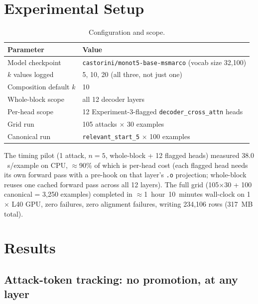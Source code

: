 \documentclass[11pt]{article}
\begin{document}
\section{Experimental Setup}

\begin{table}[H]
\centering
\caption{Configuration and scope.}
\begin{tabular}{ll}
\toprule
Parameter & Value \\
\midrule
Model checkpoint & \texttt{castorini/monot5-base-msmarco} (vocab size 32{,}100) \\
$k$ values logged & 5, 10, 20 (all three, not just one) \\
Composition default $k$ & 10 \\
Whole-block scope & all 12 decoder layers \\
Per-head scope & 12 Experiment-3-flagged \texttt{decoder\_cross\_attn} heads \\
Grid run & 105 attacks $\times$ 30 examples \\
Canonical run & \texttt{relevant\_start\_5} $\times$ 100 examples \\
\bottomrule
\end{tabular}
\end{table}

The timing pilot (1 attack, $n=5$, whole-block + 12 flagged heads) measured
$38.0$~s/example on CPU, $\approx$90\% of which is per-head cost (each
flagged head needs its own forward pass with a pre-hook on that layer's
\texttt{.o} projection; whole-block reuses one cached forward pass across
all 12 layers). The full grid (105$\times$30 + 100 canonical =
3{,}250 examples) completed in $\approx$1~hour~10~minutes wall-clock on
1$\times$ L40 GPU, zero failures, zero alignment failures, writing
234{,}106 rows (317~MB total).

\section{Results}
\label{sec:results}

\subsection{Attack-token tracking: no promotion, at any layer}
\end{document}
